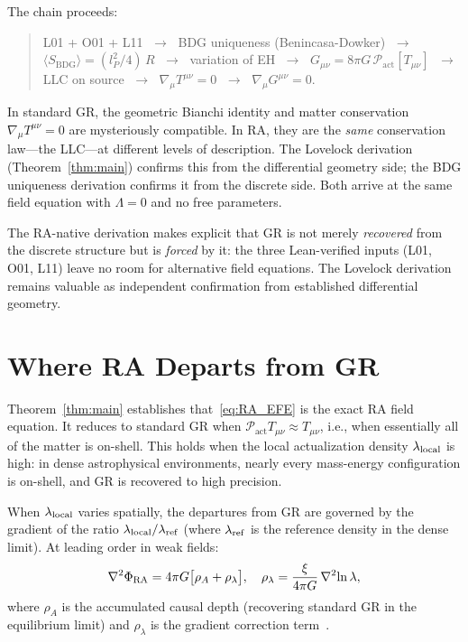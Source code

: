 \documentclass[11pt,a4paper]{article}
\newcommand{\Pact}{\mathcal{P}_{\mathrm{act}}}
\newcommand{\SBDG}{S_{\mathrm{BDG}}}
\begin{document}
\noindent The chain proceeds:
\begin{quote}
L01 + O01 + L11 $\;\to\;$ BDG uniqueness (Benincasa-Dowker)
$\;\to\;$ $\langle\SBDG\rangle = (l_P^2/4)\,R$
$\;\to\;$ variation of EH $\;\to\;$ $G_{\mu\nu} = 8\pi G\,\Pact[T_{\mu\nu}]$
$\;\to\;$ LLC on source $\;\to\;$ $\nabla_\mu T^{\mu\nu} = 0$
$\;\to\;$ $\nabla_\mu G^{\mu\nu} = 0$.
\end{quote}

\noindent In standard GR, the geometric Bianchi identity and matter
conservation $\nabla_\mu T^{\mu\nu} = 0$ are mysteriously compatible.
In RA, they are the \emph{same} conservation law---the LLC---at
different levels of description. The Lovelock derivation
(Theorem~\ref{thm:main}) confirms this from the differential geometry
side; the BDG uniqueness derivation confirms it from the discrete side.
Both arrive at the same field equation with $\Lambda = 0$ and no free
parameters.

The RA-native derivation makes explicit that GR is not merely
\emph{recovered} from the discrete structure but is \emph{forced} by it:
the three Lean-verified inputs (L01, O01, L11) leave no room for
alternative field equations. The Lovelock derivation remains valuable as
independent confirmation from established differential geometry.

\section{Where RA Departs from GR}
\label{sec:departures}

Theorem~\ref{thm:main} establishes that~\eqref{eq:RA_EFE} is the
exact RA field equation. It reduces to standard GR when
$\Pact T_{\mu\nu} \approx T_{\mu\nu}$, i.e., when essentially all
of the matter is on-shell. This holds when the local actualization
density $\lambda_{\rm local}$ is high: in dense astrophysical
environments, nearly every mass-energy configuration is on-shell, and
GR is recovered to high precision.

When $\lambda_{\rm local}$ varies spatially, the departures from GR
are governed by the gradient of the ratio $\lambda_{\rm local}/\lambda_{\rm ref}$
(where $\lambda_{\rm ref}$ is the reference density in the dense
limit). At leading order in weak fields:
\begin{equation}
  \nabla^2\Phi_{\rm RA}
  = 4\pi G\bigl[\rho_A + \rho_\lambda\bigr],
  \quad
  \rho_\lambda = \frac{\xi}{4\pi G}\,\nabla^2\!\ln\lambda,
  \label{eq:RA_correction}
\end{equation}
where $\rho_A$ is the accumulated causal depth (recovering standard
GR in the equilibrium limit) and $\rho_\lambda$ is the gradient
correction term~\citep{Sandeman2026RADM}.
\end{document}
